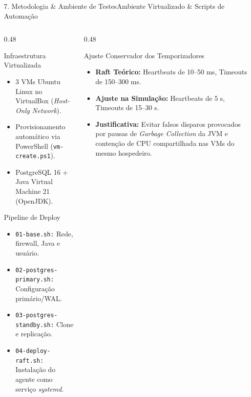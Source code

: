 \documentclass[aspectratio=169,10pt]{beamer}
\begin{document}
\begin{frame}{7. Metodologia \& Ambiente de Testes}{Ambiente Virtualizado \& Scripts de Automação}
  \begin{columns}[t]
    \begin{column}{0.48\textwidth}
      \begin{block}{Infraestrutura Virtualizada}
        \begin{itemize}
          \item 3 VMs Ubuntu Linux no VirtualBox (\textit{Host-Only Network}).
          \item Provisionamento automático via PowerShell (\texttt{vm-create.ps1}).
          \item PostgreSQL 16 + Java Virtual Machine 21 (OpenJDK).
        \end{itemize}
      \end{block}
      \begin{block}{Pipeline de Deploy}
        \begin{itemize}
          \item \texttt{01-base.sh:} Rede, firewall, Java e usuário.
          \item \texttt{02-postgres-primary.sh:} Configuração primário/WAL.
          \item \texttt{03-postgres-standby.sh:} Clone e replicação.
          \item \texttt{04-deploy-raft.sh:} Instalação do agente como serviço \textit{systemd}.
        \end{itemize}
      \end{block}
    \end{column}
    \begin{column}{0.48\textwidth}
      \begin{alertblock}{Ajuste Conservador dos Temporizadores}
        \begin{itemize}
          \item \textbf{Raft Teórico:} Heartbeats de 10--50 ms, Timeouts de 150--300 ms.
          \item \textbf{Ajuste na Simulação:} Heartbeats de 5 s, Timeouts de 15--30 s.
          \item \textbf{Justificativa:} Evitar falsos disparos provocados por pausas de \textit{Garbage Collection} da JVM e contenção de CPU compartilhada nas VMs do mesmo hospedeiro.
        \end{itemize}
      \end{alertblock}
    \end{column}
  \end{columns}
\end{frame}
\end{document}

